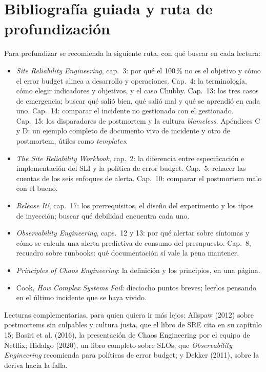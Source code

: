 \documentclass[variant=apuntes,cover=institutional,mode=screen]{ua-engineering-v6-article}
\begin{document}
\section{Bibliografía guiada y ruta de profundización}

Para profundizar se recomienda la siguiente ruta, con qué buscar en cada lectura:
\begin{itemize}
\item \emph{Site Reliability Engineering}, cap.~3: por qué el 100\,\% no es el objetivo y cómo el error budget alinea a desarrollo y operaciones. Cap.~4: la terminología, cómo elegir indicadores y objetivos, y el caso Chubby. Cap.~13: los tres casos de emergencia; buscar qué salió bien, qué salió mal y qué se aprendió en cada uno. Cap.~14: comparar el incidente no gestionado con el gestionado. Cap.~15: los disparadores de postmortem y la cultura \emph{blameless}. Apéndices C y D: un ejemplo completo de documento vivo de incidente y otro de postmortem, útiles como \emph{templates}.
\item \emph{The Site Reliability Workbook}, cap.~2: la diferencia entre especificación e implementación del SLI y la política de error budget. Cap.~5: rehacer las cuentas de los seis enfoques de alerta. Cap.~10: comparar el postmortem malo con el bueno.
\item \emph{Release It!}, cap.~17: los prerrequisitos, el diseño del experimento y los tipos de inyección; buscar qué debilidad encuentra cada uno.
\item \emph{Observability Engineering}, caps.~12 y 13: por qué alertar sobre síntomas y cómo se calcula una alerta predictiva de consumo del presupuesto. Cap.~8, recuadro sobre runbooks: qué documentación sí vale la pena mantener.
\item \emph{Principles of Chaos Engineering}: la definición y los principios, en una página.
\item Cook, \emph{How Complex Systems Fail}: dieciocho puntos breves; leerlos pensando en el último incidente que se haya vivido.
\end{itemize}

Lecturas complementarias, para quien quiera ir más lejos: Allspaw (2012) sobre postmortems sin culpables y cultura justa, que el libro de SRE cita en su capítulo 15; Basiri et al. (2016), la presentación de Chaos Engineering por el equipo de Netflix; Hidalgo (2020), un libro completo sobre SLOs, que \emph{Observability Engineering} recomienda para políticas de error budget; y Dekker (2011), sobre la deriva hacia la falla.
\end{document}
